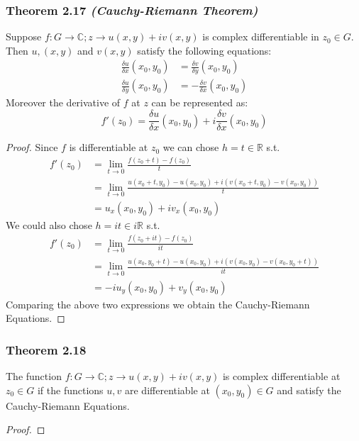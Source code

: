 \documentclass[a4paper, 12pt, twoside]{article}
\begin{document}
\subsubsection*{Theorem 2.17 \textit{(Cauchy-Riemann Theorem)}}
Suppose $f:G \to  \mathbb{C};z\to u(x,y)+iv(x,y)$ is complex differentiable in $z_{0}\in G$. Then $u,(x,y)$ and $v(x,y)$ satisfy the following equations:
\begin{align*}
    \frac{\delta u}{\delta x}(x_{0},y_{0}) &=\frac{\delta v}{\delta y}(x_{0},y_{0})\\
    \frac{\delta u}{\delta y}(x_{0},y_{0}) &=-\frac{\delta v}{\delta x}(x_{0},y_{0})
\end{align*}
Moreover the derivative of $f$ at $z$ can be represented as:
$$f'(z_{0})=\frac{\delta u}{\delta x}(x_{0},y_{0})+i\frac{\delta v}{\delta x}(x_{0},y_{0}) $$
\begin{proof}
    Since $f$ is differentiable at $z_{0}$ we can chose $h=t\in \mathbb{R}$ s.t.
    \begin{align*}
        f'(z_{0})&=\lim_{t\to 0}\frac{f(z_{0}+t)-f(z_{0})}{t}\\
        &=\lim_{t\to0}\frac{u(x_{0}+t,y_{0})-u(x_{0},y_{0})+i(v(x_{0}+t,y_{0})-v(x_{0},y_{0}))}{t}\\
        &=u_{x}(x_{0},y_{0})+iv_{x}(x_{0},y_{0})
    \end{align*}
    We could also chose $h=it\in i \mathbb{R}$ s.t.
    \begin{align*}
        f'(z_{0})&=\lim_{t\to 0}\frac{f(z_{0}+it)-f(z_{0})}{it}\\
        &=\lim_{t\to0}\frac{u(x_{0},y_{0}+t)-u(x_{0},y_{0})+i(v(x_{0},y_{0})-v(x_{0},y_{0}+t))}{it}\\
        &=-iu_{y}(x_{0},y_{0})+v_{y}(x_{0},y_{0})
    \end{align*}
    Comparing the above two expressions we obtain the Cauchy-Riemann Equations.
\end{proof}
\subsubsection*{Theorem 2.18}
The function $f:G \to  \mathbb{C};z\to u(x,y)+iv(x,y)$ is complex differentiable at $z_{0}\in G$ if the functions $u,v$ are differentiable at $(x_{0},y_{0})\in G$ and satisfy the Cauchy-Riemann Equations.
\begin{proof}

\end{proof}
\end{document}
